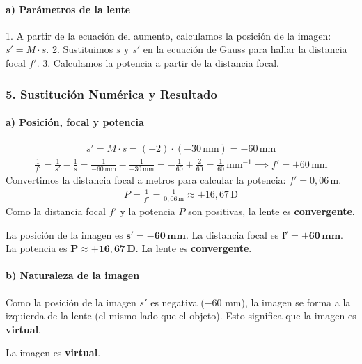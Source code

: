 \paragraph{a) Parámetros de la lente}
1. A partir de la ecuación del aumento, calculamos la posición de la imagen: $s' = M \cdot s$.
2. Sustituimos $s$ y $s'$ en la ecuación de Gauss para hallar la distancia focal $f'$.
3. Calculamos la potencia a partir de la distancia focal.

\subsubsection*{5. Sustitución Numérica y Resultado}
\paragraph{a) Posición, focal y potencia}
\begin{gather}
    s' = M \cdot s = (+2) \cdot (-30\,\text{mm}) = -60\,\text{mm}
\end{gather}
\begin{gather}
    \frac{1}{f'} = \frac{1}{s'} - \frac{1}{s} = \frac{1}{-60\,\text{mm}} - \frac{1}{-30\,\text{mm}} = -\frac{1}{60} + \frac{2}{60} = \frac{1}{60}\,\text{mm}^{-1} \implies f' = +60\,\text{mm}
\end{gather}
Convertimos la distancia focal a metros para calcular la potencia: $f' = 0,06\,\text{m}$.
\begin{gather}
    P = \frac{1}{f'} = \frac{1}{0,06\,\text{m}} \approx +16,67\,\text{D}
\end{gather}
Como la distancia focal $f'$ y la potencia $P$ son positivas, la lente es \textbf{convergente}.

\begin{cajaresultado}
    La posición de la imagen es $\boldsymbol{s' = -60\,\textbf{mm}}$. La distancia focal es $\boldsymbol{f'=+60\,\textbf{mm}}$. La potencia es $\boldsymbol{P \approx +16,67\,\textbf{D}}$. La lente es \textbf{convergente}.
\end{cajaresultado}

\paragraph{b) Naturaleza de la imagen}
Como la posición de la imagen $s'$ es negativa ($-60$ mm), la imagen se forma a la izquierda de la lente (el mismo lado que el objeto). Esto significa que la imagen es \textbf{virtual}.
\begin{cajaresultado}
    La imagen es \textbf{virtual}.
\end{cajaresultado}

